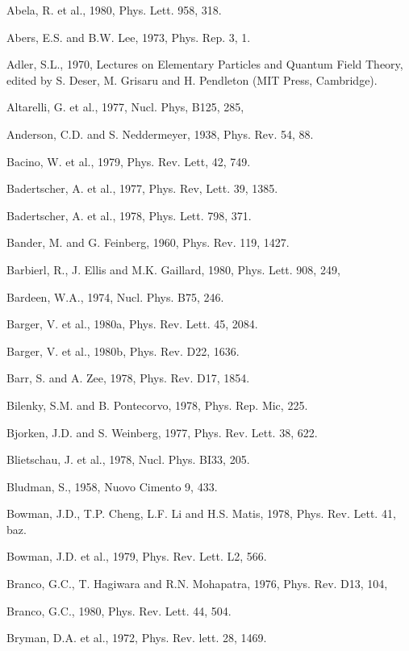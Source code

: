 \documentclass[twoside]{article}
\begin{document}
{{{{{{{{{{{{{{{{
\begin{thebibliography}{10}

Abela, R. et al., 1980, Phys. Lett. 958, 318.

Abers, E.S. and B.W. Lee, 1973, Phys. Rep. 3, 1.


\bibitem{}
Adler, S.L., 1970, Lectures on Elementary Particles and Quantum Field
Theory, edited by S. Deser, M. Grisaru and H. Pendleton (MIT Press,
Cambridge).

\bibitem{}
Altarelli, G. et al., 1977, Nucl. Phys, B125, 285,

\bibitem{}
Anderson, C.D. and S. Neddermeyer, 1938, Phys. Rev. 54, 88.

\bibitem{}
Bacino, W. et al., 1979, Phys. Rev. Lett, 42, 749.

\bibitem{}
Badertscher, A. et al., 1977, Phys. Rev, Lett. 39, 1385.

\bibitem{}
Badertscher, A. et al., 1978, Phys. Lett. 798, 371.

\bibitem{}
Bander, M. and G. Feinberg, 1960, Phys. Rev. 119, 1427.

\bibitem{}
Barbierl, R., J. Ellis and M.K. Gaillard, 1980, Phys. Lett. 908, 249,

\bibitem{}
Bardeen, W.A., 1974, Nucl. Phys. B75, 246.

\bibitem{}
Barger, V. et al., 1980a, Phys. Rev. Lett. 45, 2084.

\bibitem{}
Barger, V. et al., 1980b, Phys. Rev. D22, 1636.

\bibitem{}
Barr, S. and A. Zee, 1978, Phys. Rev. D17, 1854.

\bibitem{}
Bilenky, S.M. and B. Pontecorvo, 1978, Phys. Rep. Mic, 225.

\bibitem{}
Bjorken, J.D. and S. Weinberg, 1977, Phys. Rev. Lett. 38, 622.

\bibitem{}
Blietschau, J. et al., 1978, Nucl. Phys. BI33, 205.

\bibitem{}
Bludman, S., 1958, Nuovo Cimento 9, 433.

\bibitem{}
Bowman, J.D., T.P. Cheng, L.F. Li and H.S. Matis, 1978, Phys. Rev. Lett. 41, baz.

\bibitem{}
Bowman, J.D. et al., 1979, Phys. Rev. Lett. L2, 566.

\bibitem{}
Branco, G.C., T. Hagiwara and R.N. Mohapatra, 1976, Phys. Rev. D13, 104,

\bibitem{}
Branco, G.C., 1980, Phys. Rev. Lett. 44, 504.

\bibitem{}
Bryman, D.A. et al., 1972, Phys. Rev. lett. 28, 1469.


\end{thebibliography}}}}}}}}}}}}}}}}}
\end{document}
